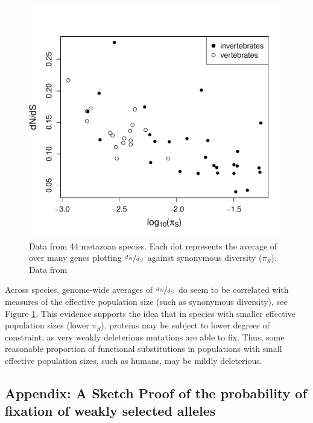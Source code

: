 {%


\begin{figure}
\begin{center}
\includegraphics[width=\textwidth]{Journal_figs/drift_selection/Galtier_dNdS/Galtier_dNdS.pdf}
\end{center}
\caption{Data from 44 metazoan species. Each dot represents the
  average of over many genes plotting $\nicefrac{d_N}{d_S}$ against synonymous
  diversity ($\pi_S$). Data from \citet{galtier2016adaptive} } \label{Galtier_dNdS}
\end{figure}

Across species, genome-wide averages of $\nicefrac{d_N}{d_S}$ do seem to be
correlated with measures of the effective population size (such as
synonymous diversity), see Figure \ref{Galtier_dNdS}. This evidence supports the idea that in species with smaller effective
population sizes (lower $\pi_S$), proteins may be subject to lower degrees of
constraint, as very weakly deleterious mutations are able to fix. Thus,
some reasonable proportion of functional substitutions in populations
with small effective population sizes, such as humans, may be mildly deleterious.

\subsection{Appendix: A Sketch Proof of the probability of fixation of
weakly selected alleles} \label{Section:fixation_weakly_sel}

}
